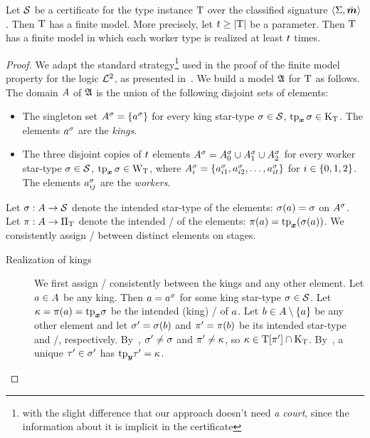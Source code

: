 \begin{theorem}\label{lem:cert-expand}
Let $\mathcal{S}$ be a certificate for the type instance $\mathrm{T}$ over the classified
signature $\left\langle \mathrm{\Sigma},\bar{\bm{m}} \right\rangle$.
Then $\mathrm{T}$ has a finite model.
More precisely, let $t \geq \left|\mathrm{T}\right|$ be a parameter.
Then $\mathrm{T}$ has a finite model in which each worker type is realized at least
$t$ times.
\end{theorem}
\begin{proof}
We adapt the standard strategy\footnote{with the slight difference that our
approach doesn't need \emph{a court}, since the information about it is implicit
in the certificate} used in the proof of the finite model property for the logic
$\mathcal{L}^{2}$, as presented in~\cite{gradel1999logics}.
We build a model $\mathfrak{A}$ for $\mathrm{T}$ as follows.
The domain $A$ of $\mathfrak{A}$ is the union of the following disjoint sets of
elements:
\begin{itemize}
  \item
  The singleton set $A^{\sigma} = \left\{a^{\sigma}\right\}$ for every king star-type
  $\sigma\in\mathcal{S}$, $\operatorname{tp}_{\bm{x}}\sigma \in {\mathrm{K}}_{\mathrm{T}}$.
  The elements $a^{\sigma}$ are the \emph{kings}.
  \item 
  The three disjoint copies of $t$ elements
  $A^{\sigma} = A^{\sigma}_{0} \cup A^{\sigma}_{1} \cup A^{\sigma}_{2}$ for every
  worker star-type $\sigma \in \mathcal{S}$, $\operatorname{tp}_{\bm{x}}\sigma \in {\mathrm{W}}_{\mathrm{T}}$,
  where $A^{\sigma}_{i} = \left\{a^{\sigma}_{i 1}, a^{\sigma}_{i 2}, \dots,
  a^{\sigma}_{i t}\right\}$ for $i \in \left\{0,1,2\right\}$.
  The elements $a^{\sigma}_{i j}$ are the \emph{workers}.
\end{itemize}
Let $\sigma : A \to \mathcal{S}$ denote the intended star-type of the elements:
$\sigma(a) = \sigma$ on $A^{\sigma}$.
Let $\pi : A \to {\Pi}_{\mathrm{T}}$ denote the intended \onetype/ of the elements:
$\pi(a) = \mathrm{tp}_{\bm{x}}(\sigma(a))$.
We consistently assign \twotypes/ between distinct elements on stages.
\begin{description}
  \item[Realization of kings]
  We first assign \twotypes/ consistently between the kings and any other
  element.
  Let $a\in A$ be any king.
  Then $a = a^{\sigma}$ for some king star-type $\sigma\in\mathcal{S}$.
  Let $\kappa = \pi(a) = \mathrm{tp}_{\bm{x}}\sigma$ be the intended (king) \onetype/ of $a$.
  Let $b \in A \setminus \left\{a\right\}$ be any other element and let
  ${\sigma'}=\sigma(b)$ and ${\pi'}=\pi(b)$ be its intended star-type and
  \onetype/, respectively.
  By~, ${\sigma'} \neq \sigma$ and ${\pi'} \neq \kappa$,
  so $\kappa \in \mathrm{T}[{\pi'}] \cap {\mathrm{K}}_{\mathrm{T}}$.
  By~, a unique ${\tau'}\in{\sigma'}$ has $\mathrm{tp}_{\bm{y}}{\tau'} = \kappa$.

\end{description}
\end{proof}
